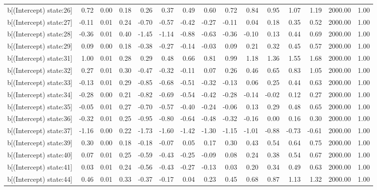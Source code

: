 \begin{table}[ht]
\begin{tabular}{rrrrrrrrrrrrrrr}
  b[(Intercept) state:26] & 0.72 & 0.00 & 0.18 & 0.26 & 0.37 & 0.49 & 0.60 & 0.72 & 0.84 & 0.95 & 1.07 & 1.19 & 2000.00 & 1.00 \\ 
  b[(Intercept) state:27] & -0.11 & 0.01 & 0.24 & -0.70 & -0.57 & -0.42 & -0.27 & -0.11 & 0.04 & 0.18 & 0.35 & 0.52 & 2000.00 & 1.00 \\ 
  b[(Intercept) state:28] & -0.36 & 0.01 & 0.40 & -1.45 & -1.14 & -0.88 & -0.63 & -0.36 & -0.10 & 0.13 & 0.44 & 0.69 & 2000.00 & 1.00 \\ 
  b[(Intercept) state:29] & 0.09 & 0.00 & 0.18 & -0.38 & -0.27 & -0.14 & -0.03 & 0.09 & 0.21 & 0.32 & 0.45 & 0.57 & 2000.00 & 1.00 \\ 
  b[(Intercept) state:31] & 1.00 & 0.01 & 0.28 & 0.29 & 0.48 & 0.66 & 0.81 & 0.99 & 1.18 & 1.36 & 1.55 & 1.68 & 2000.00 & 1.00 \\ 
  b[(Intercept) state:32] & 0.27 & 0.01 & 0.30 & -0.47 & -0.32 & -0.11 & 0.07 & 0.26 & 0.46 & 0.65 & 0.83 & 1.05 & 2000.00 & 1.00 \\ 
  b[(Intercept) state:33] & -0.13 & 0.01 & 0.29 & -0.85 & -0.68 & -0.51 & -0.32 & -0.13 & 0.06 & 0.25 & 0.44 & 0.63 & 2000.00 & 1.00 \\ 
  b[(Intercept) state:34] & -0.28 & 0.00 & 0.21 & -0.82 & -0.69 & -0.54 & -0.42 & -0.28 & -0.14 & -0.02 & 0.12 & 0.27 & 2000.00 & 1.00 \\ 
  b[(Intercept) state:35] & -0.05 & 0.01 & 0.27 & -0.70 & -0.57 & -0.40 & -0.24 & -0.06 & 0.13 & 0.29 & 0.48 & 0.65 & 2000.00 & 1.00 \\ 
  b[(Intercept) state:36] & -0.32 & 0.01 & 0.25 & -0.95 & -0.80 & -0.64 & -0.48 & -0.32 & -0.16 & 0.00 & 0.16 & 0.30 & 2000.00 & 1.00 \\ 
  b[(Intercept) state:37] & -1.16 & 0.00 & 0.22 & -1.73 & -1.60 & -1.42 & -1.30 & -1.15 & -1.01 & -0.88 & -0.73 & -0.61 & 2000.00 & 1.00 \\ 
  b[(Intercept) state:39] & 0.30 & 0.00 & 0.18 & -0.18 & -0.07 & 0.05 & 0.17 & 0.30 & 0.43 & 0.54 & 0.64 & 0.75 & 2000.00 & 1.00 \\ 
  b[(Intercept) state:40] & 0.07 & 0.01 & 0.25 & -0.59 & -0.43 & -0.25 & -0.09 & 0.08 & 0.24 & 0.38 & 0.54 & 0.67 & 2000.00 & 1.00 \\ 
  b[(Intercept) state:41] & 0.03 & 0.01 & 0.24 & -0.56 & -0.43 & -0.27 & -0.13 & 0.03 & 0.20 & 0.34 & 0.49 & 0.63 & 2000.00 & 1.00 \\ 
  b[(Intercept) state:44] & 0.46 & 0.01 & 0.33 & -0.37 & -0.17 & 0.04 & 0.23 & 0.45 & 0.68 & 0.87 & 1.13 & 1.32 & 2000.00 & 1.00 \\ 

\end{tabular}
\end{table}
